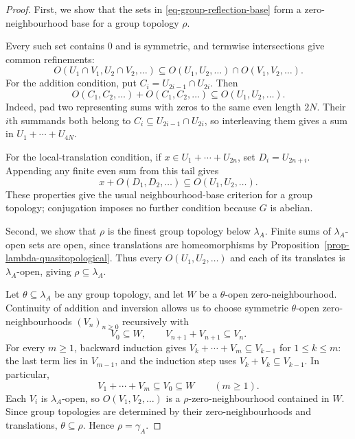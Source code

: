 \documentclass[preprint,3p]{elsarticle}
\theoremstyle{plain}
\theoremstyle{definition}
\numberwithin{equation}{section}
\begin{document}
\begin{proof}
First, we show that the sets in \eqref{eq-group-reflection-base}
form a zero-neighbourhood base for a group topology $\rho$.

Every such set contains $0$ and is symmetric, and termwise
intersections give common refinements:
\[
 O(U_1\cap V_1,U_2\cap V_2,\ldots)
 \subseteq O(U_1,U_2,\ldots)\cap O(V_1,V_2,\ldots).
\]
For the addition condition, put $C_i=U_{2i-1}\cap U_{2i}$.
Then
\[
 O(C_1,C_2,\ldots)+O(C_1,C_2,\ldots)
 \subseteq O(U_1,U_2,\ldots).
\]
Indeed, pad two representing sums with zeros to the same even
length $2N$.  Their $i$th summands both belong to
$C_i\subseteq U_{2i-1}\cap U_{2i}$, so interleaving them gives
a sum in $U_1+\cdots+U_{4N}$.

For the local-translation condition, if
$x\in U_1+\cdots+U_{2n}$, set $D_i=U_{2n+i}$.  Appending any
finite even sum from this tail gives
\[
 x+O(D_1,D_2,\ldots)\subseteq O(U_1,U_2,\ldots).
\]
These properties give the usual neighbourhood-base criterion for
a group topology; conjugation imposes no further condition because
$G$ is abelian.

Second, we show that $\rho$ is the finest group topology below $\lambda_A$.
Finite sums of $\lambda_A$-open sets are open, since translations
are homeomorphisms by
Proposition~\ref{prop-lambda-quasitopological}.
Thus every $O(U_1,U_2,\ldots)$ and each of its translates is
$\lambda_A$-open, giving $\rho\subseteq\lambda_A$.

Let $\theta\subseteq\lambda_A$ be any group topology, and let $W$
be a $\theta$-open zero-neighbourhood.  Continuity of addition and
inversion allows us to choose symmetric $\theta$-open
zero-neighbourhoods $(V_n)_{n\geq0}$ recursively with
\[
 V_0\subseteq W,\qquad V_{n+1}+V_{n+1}\subseteq V_n.
\]
For every $m\geq1$, backward induction gives
$V_k+\cdots+V_m\subseteq V_{k-1}$ for $1\leq k\leq m$:
the last term lies in $V_{m-1}$, and the induction step uses
$V_k+V_k\subseteq V_{k-1}$.
In particular,
\[
 V_1+\cdots+V_m\subseteq V_0\subseteq W
 \qquad(m\geq1).
\]
Each $V_i$ is $\lambda_A$-open, so
$O(V_1,V_2,\ldots)$ is a $\rho$-zero-neighbourhood contained in $W$.
Since group topologies are determined by their zero-neighbourhoods
and translations, $\theta\subseteq\rho$.
Hence $\rho=\gamma_A$.
\end{proof}
\end{document}
